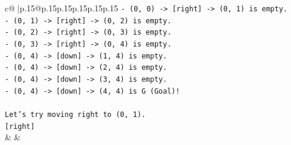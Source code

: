 \documentclass{article}
\begin{document}
{\begin{supertabular}{c@{$\;$}|p{.15\linewidth}@{}p{.15\linewidth}p{.15\linewidth}p{.15\linewidth}p{.15\linewidth}p{.15\linewidth}}
{{{\texttt{{-} (0, 0) {-}> {[}right{]} {-}> (0, 1) is empty.} \\
\texttt{{-} (0, 1) {-}> {[}right{]} {-}> (0, 2) is empty.} \\
\texttt{{-} (0, 2) {-}> {[}right{]} {-}> (0, 3) is empty.} \\
\texttt{{-} (0, 3) {-}> {[}right{]} {-}> (0, 4) is empty.} \\
\texttt{{-} (0, 4) {-}> {[}down{]} {-}> (1, 4) is empty.} \\
\texttt{{-} (0, 4) {-}> {[}down{]} {-}> (2, 4) is empty.} \\
\texttt{{-} (0, 4) {-}> {[}down{]} {-}> (3, 4) is empty.} \\
\texttt{{-} (0, 4) {-}> {[}down{]} {-}> (4, 4) is G (Goal)!} \\
\\ 
\texttt{Let's try moving right to (0, 1).} \\
\texttt{{[}right{]}} \\
            }
        }
    }
    & & \\ \\


\end{supertabular}}
\end{document}
